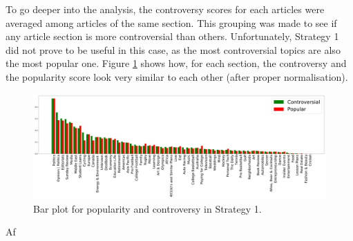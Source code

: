To go deeper into the analysis, the controversy scores for each articles were averaged among articles of the same section. This grouping was made to see if any article section is more controversial than others. Unfortunately, Strategy 1 did not prove to be useful in this case, as the most controversial topics are also the most popular one. Figure \ref{RG1} shows how, for each section, the controversy and the popularity score look very similar to each other (after proper normalisation).

\begin{figure}
\centering
\includegraphics[width=\tw]{Pictures/Strat1SN.pdf}
\caption{Bar plot for popularity and controversy in Strategy 1.}
\label{RG1}
\end{figure}

Af